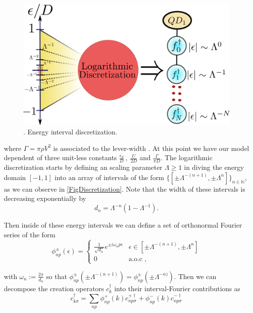 \begin{figure}[h]
\centering
\includegraphics[scale=0.5]{IMAGES/DQD/NRG-Final.png}\caption{\label{FigDiscretization}.
Energy interval discretization. \label{Energy-interval-discretization} \protect{} }
\end{figure}


where $\Gamma=\pi\rho V^{2}$ is associated to the lever-width \citep[(3.5)]{sindel_numerical_2005}.
At this point we have our model dependent of three unit-less constants
$\frac{\epsilon_{d}}{D}\ ,\ \frac{U}{2D}$ and $\frac{\Gamma}{\pi D}$.
The logarithmic discretization starts by defining an scaling parameter
$\Lambda\geq1$ in diving the energy domain $[-1,1]$ into an array
of intervals of the form $\{[\pm\Lambda^{-(n+1)},\pm\Lambda^{n}]\}_{n\in\mathbb{N}}$,
as we can observe in \ref{FigDiscretization}. Note that the width
of these intervals is decreasing exponentially by 
\[
d_{n}=\Lambda^{-n}\left(1-\Lambda^{-1}\right).
\]


Then inside of these energy intervals we can define a set of orthonormal
Fourier series of the form
\begin{equation}
\phi_{np}^{\pm}(\epsilon)=\begin{cases}
\frac{1}{\sqrt{d_{n}}}e^{\pm i\omega_{n}p\epsilon} & \epsilon\in[\pm\Lambda^{-(n+1)},\pm\Lambda^{n}]\\
0 & \mbox{a.o.c },
\end{cases}\label{eq:orthonormal-Fourier}
\end{equation}


with $\omega_{n}:=\frac{2\pi}{d_{n}}$ so that $\phi_{np}^{\pm}\left(\pm\Lambda^{-(n+1)}\right)=\phi_{np}^{\pm}\left(\pm\Lambda^{-n)}\right).$
Then we can decompose the creation operators $c_{k}^{\dagger}$ into
their interval-Fourier contributions as 
\begin{equation}
c_{k\sigma}^{\dagger}=\sum_{np}\phi_{np}^{+}(k)c_{np\sigma}^{+\dagger}+\phi_{np}^{-}(k)c_{np\sigma}^{-\dagger}\label{eq:Fourier-interval decomposition}
\end{equation}


